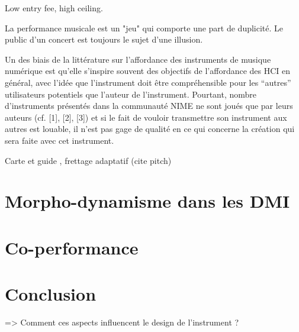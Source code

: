 Low entry fee, high ceiling.

La performance musicale est un "jeu" qui comporte une part de duplicité. Le public d'un concert est toujours le sujet d'une illusion. 

Un des biais de la littérature sur l’affordance des instruments de musique numérique est qu’elle s’inspire souvent des objectifs de l’affordance des HCI en général, avec l’idée que l’instrument doit être compréhensible pour les “autres” utilisateurs potentiels que l’auteur de l’instrument. Pourtant, nombre d’instruments présentés dans la communauté NIME ne sont joués que par leurs auteurs (cf. [1], [2], [3]) et si le fait de vouloir transmettre son instrument aux autres est louable, il n’est pas gage de qualité en ce qui concerne la création qui sera faite avec cet instrument.     

\cite{bin_show_2018}

Carte et guide , frettage adaptatif (cite pitch)

\section{Morpho-dynamisme dans les DMI}

\section{Co-performance}


\section{Conclusion}
\label{sec:transparency:conclusion}
=> Comment ces aspects influencent le design de l’instrument ?


